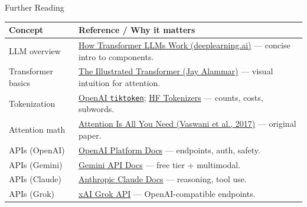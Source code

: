 \documentclass[aspectratio=169]{beamer}
\begin{document}
\begin{frame}{Further Reading}
  \vspace{-0.4em}
  \begin{tabular}{@{}p{3.8cm}p{7.8cm}@{}}
    \toprule
    \textbf{Concept} & \textbf{Reference / Why it matters} \\
    \midrule
    LLM overview & \href{https://learn.deeplearning.ai/courses/how-transformer-llms-work}{How Transformer LLMs Work (deeplearning.ai)} — concise intro to components. \\
    Transformer basics & \href{https://jalammar.github.io/illustrated-transformer/}{The Illustrated Transformer (Jay Alammar)} — visual intuition for attention. \\
    Tokenization & \href{https://github.com/openai/tiktoken}{OpenAI \texttt{tiktoken}}; \href{https://huggingface.co/docs/tokenizers/index}{HF Tokenizers} — counts, costs, subwords. \\
    Attention math & \href{https://arxiv.org/abs/1706.03762}{Attention Is All You Need (Vaswani et al., 2017)} — original paper. \\
    APIs (OpenAI) & \href{https://platform.openai.com/docs}{OpenAI Platform Docs} — endpoints, auth, safety. \\
    APIs (Gemini) & \href{https://ai.google.dev/gemini-api/docs}{Gemini API Docs} — free tier + multimodal. \\
    APIs (Claude) & \href{https://docs.anthropic.com}{Anthropic Claude Docs} — reasoning, tool use. \\
    APIs (Grok) & \href{https://x.ai/api}{xAI Grok API} — OpenAI-compatible endpoints. \\
     \bottomrule
  \end{tabular}
\end{frame}
\end{document}
